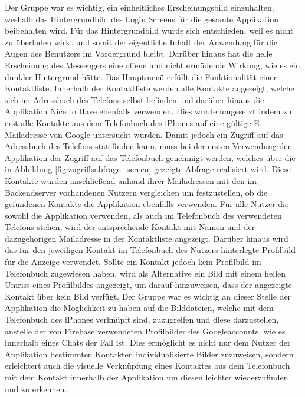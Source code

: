 Der Gruppe war es wichtig, ein einheitliches Erscheinungsbild einzuhalten, weshalb das Hintergrundbild des Login Screens für die gesamte Applikation beibehalten wird. Für das Hintergrundbild wurde sich entschieden, weil es nicht zu überladen wirkt und somit der eigentliche Inhalt der Anwendung für die Augen des Benutzers im Vordergrund bleibt. Darüber hinaus hat die helle Erscheinung des Messengers eine offene und nicht ermüdende Wirkung, wie es ein dunkler Hintergrund hätte.
\newline
\newline
Das Hauptmenü erfüllt die Funktionalität einer Kontaktliste. Innerhalb der Kontaktliste werden alle Kontakte angezeigt, welche sich im Adressbuch des Telefons selbst befinden und darüber hinaus die Applikation Nice to Have ebenfalls verwenden. Dies wurde umgesetzt indem zu erst alle Kontakte aus dem Telefonbuch des iPhones auf eine gültige E-Mailadresse von Google untersucht wurden.
Damit jedoch ein Zugriff auf das Adressbuch des Telefons stattfinden kann, muss bei der ersten Verwendung der Applikation der Zugriff auf das Telefonbuch genehmigt werden, welches über die in Abbildung \ref{fig:zugriffsabfrage_screen} gezeigte Abfrage realisiert wird.
Diese Kontakte wurden anschließend anhand ihrer Mailadressen mit den im Backendserver vorhandenen Nutzern vergleichen um festzustellen, ob die gefundenen Kontakte die Applikation ebenfalls verwenden.
\newpage
Für alle Nutzer die sowohl die Applikation verwenden, als auch im Telefonbuch des verwendeten Telefons stehen, wird der entsprechende Kontakt mit Namen und der dazugehörigen Mailadresse in der Kontaktliste angezeigt.
Darüber hinaus wird das für den jeweiligen Kontakt im Telefonbuch des Nutzers hinterlegte Profilbild für die Anzeige verwendet. Sollte ein Kontakt jedoch kein Profilbild im Telefonbuch zugewiesen haben, wird als Alternative ein Bild mit einem hellen Umriss eines Profilbildes angezeigt, um darauf hinzuweisen, dass der angezeigte Kontakt über kein Bild verfügt. Der Gruppe war es wichtig an dieser Stelle der Applikation die Möglichkeit zu haben auf die Bilddateien, welche mit dem Telefonbuch des iPhones verknüpft sind, zuzugreifen und diese darzustellen, anstelle der von Firebase verwendeten Profilbilder des Googleaccounts, wie es innerhalb eines Chats der Fall ist. Dies ermöglicht es nicht nur dem Nutzer der Applikation bestimmten Kontakten individualisierte Bilder zuzuweisen, sondern erleichtert auch die visuelle Verknüpfung eines Kontaktes aus dem Telefonbuch mit dem Kontakt innerhalb der Applikation um diesen leichter wiederzufinden und zu erkennen.
\newpage
